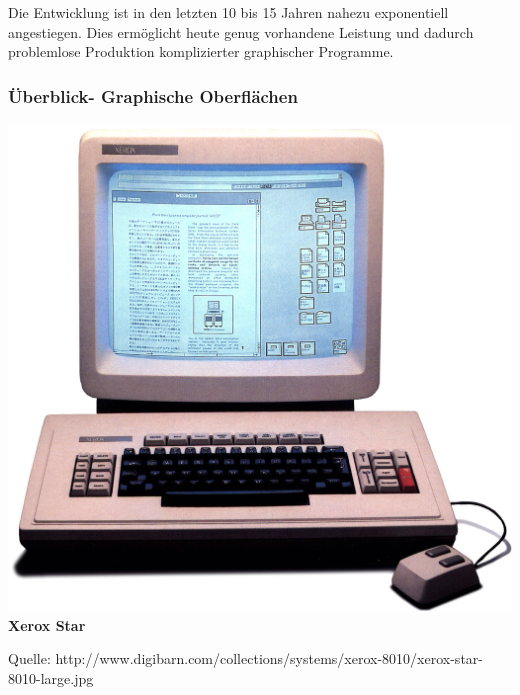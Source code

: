 \documentclass[12pt,a4paper]{report}
\begin{document}
\begin{onehalfspace}
Die Entwicklung  ist in den letzten 10 bis 15 Jahren nahezu exponentiell angestiegen. Dies ermöglicht heute genug vorhandene Leistung und dadurch problemlose Produktion komplizierter graphischer Programme.

\subsubsection{Überblick- Graphische Oberflächen}
\begin{center}
\includegraphics[scale=1]{../docs/lyaton/graphics/Xerox-Star.jpg}\\
\textbf{Xerox Star}\\
\begin{scriptsize}
Quelle: http://www.digibarn.com/collections/systems/xerox-8010/xerox-star-8010-large.jpg
\end{scriptsize}
\end{center}


\end{onehalfspace}
\end{document}
